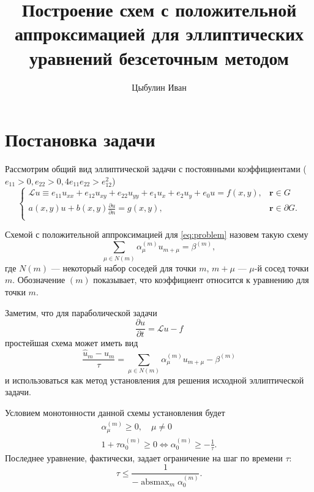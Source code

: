 \documentclass[12pt]{article}
\author{Цыбулин Иван}
\title{Построение схем с положительной аппроксимацией для эллиптических уравнений безсеточным методом}
\renewcommand{\vec}[1]{\boldsymbol{\mathbf{#1}}}
\newcommand{\pd}[2]{\frac{\partial{#1}}{\partial {#2}}}
\begin{document}
\maketitle

\section{Постановка задачи}

Рассмотрим общий вид эллиптической задачи с постоянными коэффициентами ($e_{11} > 0, e_{22} > 0, 4e_{11}e_{22} > e_{12}^2$)
\begin{equation}
\begin{cases}
\mathcal{L} u \equiv
e_{11} u_{xx} + e_{12} u_{xy} + e_{22} u_{yy}
+ e_1 u_x + e_2 u_y + e_0 u = f(x, y), &\vec r \in G\\
a(x,y) u + b(x,y) \pd{u}{n} = g(x,y), &\vec r \in \partial G.\\
\end{cases}
\label{eq:problem}
\end{equation}

Схемой с положительной аппроксимацией для \eqref{eq:problem} назовем такую схему
\[
\sum_{\mu \in N(m)} \alpha_{\mu}^{(m)} u_{m+\mu} = \beta^{(m)},
\]
где $N(m)$ --- некоторый набор соседей для точки $m$, $m+\mu$ --- $\mu$-й сосед точки $m$. Обозначение $(m)$ показывает, что коэффициент относится к уравнению для точки $m$. 

Заметим, что для параболической задачи
\[
\pd{u}{t} = \mathcal{L} u - f
\]
простейшая схема может иметь вид
\[
\frac{\hat u_m - u_m}{\tau} = 
\sum_{\mu \in N(m)} \alpha_{\mu}^{(m)} u_{m+\mu} - \beta^{(m)}
\]
и использоваться как метод установления для решения исходной эллиптической задачи.

Условием монотонности данной схемы установления будет 
\begin{gather*}
\alpha_{\mu}^{(m)} \geqslant 0, \quad \mu \neq 0\\
1 + \tau \alpha_0^{(m)} \geqslant 0 \Leftrightarrow \alpha_0^{(m)} \geqslant -\frac{1}{\tau}.
\end{gather*}
Последнее уравнение, фактически, задает ограничение на шаг по времени $\tau$:
\[
\tau \leqslant \frac{1}{-\operatorname{absmax}_m \alpha_0^{(m)}}.
\]
\end{document}
